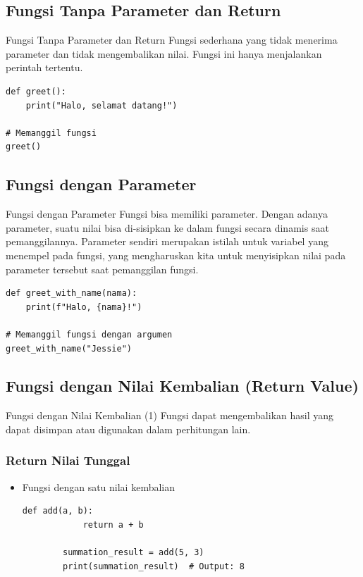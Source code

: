 \documentclass[aspectratio=169, table]{beamer}
\begin{document}
\subsection{Fungsi Tanpa Parameter dan Return}
\begin{frame}[fragile]{Fungsi Tanpa Parameter dan Return}
Fungsi sederhana yang tidak menerima parameter dan tidak mengembalikan nilai. Fungsi ini hanya menjalankan perintah tertentu.

\begin{lstlisting}[style=PythonStyle, caption={Kode Python: basic_function.py}]
def greet():
    print("Halo, selamat datang!")

# Memanggil fungsi
greet()
\end{lstlisting}
\end{frame}

\subsection{Fungsi dengan Parameter}

\begin{frame}[fragile]{Fungsi dengan Parameter}
Fungsi bisa memiliki parameter. Dengan adanya parameter, suatu nilai bisa di-sisipkan ke dalam fungsi secara dinamis saat pemanggilannya.
Parameter sendiri merupakan istilah untuk variabel yang menempel pada fungsi, yang mengharuskan kita untuk menyisipkan nilai pada parameter tersebut saat pemanggilan fungsi.

\begin{lstlisting}[style=PythonStyle, caption={Kode Python: parameter_function.py}]
def greet_with_name(nama):
    print(f"Halo, {nama}!")

# Memanggil fungsi dengan argumen
greet_with_name("Jessie")
\end{lstlisting}
\end{frame}

\subsection{Fungsi dengan Nilai Kembalian (Return Value)}

\begin{frame}[fragile]{Fungsi dengan Nilai Kembalian (1)}
Fungsi dapat mengembalikan hasil yang dapat disimpan atau digunakan dalam perhitungan lain.

\subsubsection{Return Nilai Tunggal}
\begin{itemize}
    \item Fungsi dengan satu nilai kembalian
        \begin{lstlisting}[style=PythonStyle, caption={Kode Python: function_with_single_return.py}]
        def add(a, b):
            return a + b

        summation_result = add(5, 3)
        print(summation_result)  # Output: 8
        \end{lstlisting}
\end{itemize}
\end{frame}
\end{document}
